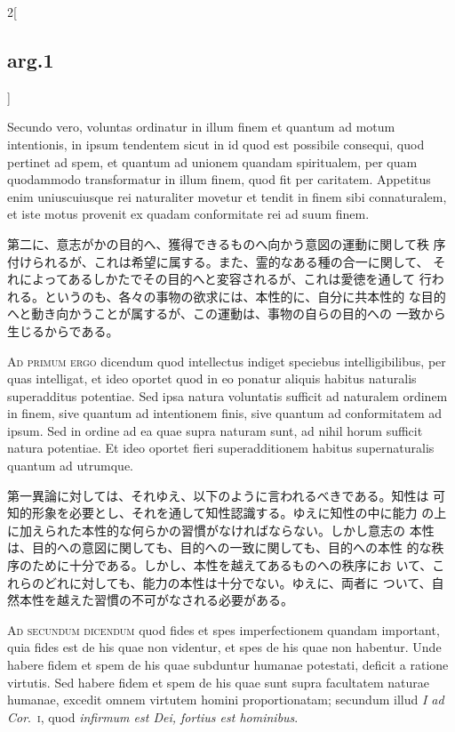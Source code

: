 \documentclass[paper=a4paper,fontsize=10pt,jafontsize=9pt,titlepage]{jlreq}
\begin{document}
\begin{paracol}{2}[\subsection{arg.1}]
\switchcolumn*

Secundo vero, voluntas ordinatur in illum finem et quantum ad motum
intentionis, in ipsum tendentem sicut in id quod est possibile
consequi, quod pertinet ad spem, et quantum ad unionem quandam
spiritualem, per quam quodammodo transformatur in illum finem, quod
fit per caritatem. Appetitus enim uniuscuiusque rei naturaliter
movetur et tendit in finem sibi connaturalem, et iste motus provenit
ex quadam conformitate rei ad suum finem.

\switchcolumn

第二に、意志がかの目的へ、獲得できるものへ向かう意図の運動に関して秩
 序付けられるが、これは希望に属する。また、霊的なある種の合一に関して、
 それによってあるしかたでその目的へと変容されるが、これは愛徳を通して
 行われる。というのも、各々の事物の欲求には、本性的に、自分に共本性的
 な目的へと動き向かうことが属するが、この運動は、事物の自らの目的への
 一致から生じるからである。

\switchcolumn*[\subsection{ad.1}]

{\scshape Ad primum ergo} dicendum quod intellectus indiget speciebus
intelligibilibus, per quas intelligat, et ideo oportet quod in eo
ponatur aliquis habitus naturalis superadditus potentiae. Sed ipsa
natura voluntatis sufficit ad naturalem ordinem in finem, sive quantum
ad intentionem finis, sive quantum ad conformitatem ad ipsum. Sed in
ordine ad ea quae supra naturam sunt, ad nihil horum sufficit natura
potentiae. Et ideo oportet fieri superadditionem habitus
supernaturalis quantum ad utrumque.

\switchcolumn

第一異論に対しては、それゆえ、以下のように言われるべきである。知性は
 可知的形象を必要とし、それを通して知性認識する。ゆえに知性の中に能力
 の上に加えられた本性的な何らかの習慣がなければならない。しかし意志の
 本性は、目的への意図に関しても、目的への一致に関しても、目的への本性
 的な秩序のために十分である。しかし、本性を越えてあるものへの秩序にお
 いて、これらのどれに対しても、能力の本性は十分でない。ゆえに、両者に
 ついて、自然本性を越えた習慣の不可がなされる必要がある。

\switchcolumn*[\subsection{ad.2}]

{\scshape Ad secundum dicendum} quod fides et spes imperfectionem
quandam important, quia fides est de his quae non videntur, et spes de
his quae non habentur. Unde habere fidem et spem de his quae subduntur
humanae potestati, deficit a ratione virtutis. Sed habere fidem et
spem de his quae sunt supra facultatem naturae humanae, excedit omnem
virtutem homini proportionatam; secundum illud {\itshape I ad
Cor}.~{\scshape i}, quod {\itshape infirmum est Dei, fortius est
hominibus}.


\end{paracol}
\end{document}
